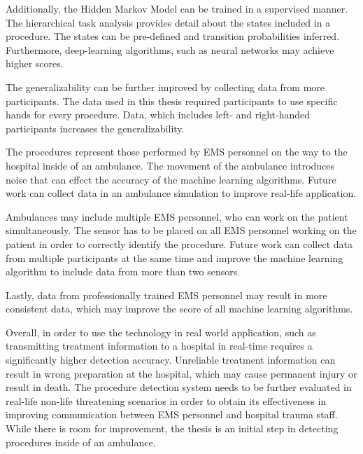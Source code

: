 \par Additionally, the Hidden Markov Model can be trained in a supervised manner. The hierarchical task analysis provides detail about the states included in a procedure. The states can be pre-defined and transition probabilities inferred. Furthermore, deep-learning algorithms, such as neural networks may achieve higher scores.
\par The generalizability can be further improved by collecting data from more participants. The data used in this thesis required participants to use specific hands for every procedure. Data, which includes left- and right-handed participants increases the generalizability.
\par The procedures represent those performed by EMS personnel on the way to the hospital inside of an ambulance. The movement of the ambulance introduces noise that can effect the accuracy of the machine learning algorithms. Future work can collect data in an ambulance simulation to improve real-life application.
\par Ambulances may include multiple EMS personnel, who can work on the patient simultaneously. The sensor has to be placed on all EMS personnel working on the patient in order to correctly identify the procedure. Future work can collect data from multiple participants at the same time and improve the machine learning algorithm to include data from more than two sensors.
\par Lastly, data from professionally trained EMS personnel may result in more consistent data, which may improve the score of all machine learning algorithms.
\par Overall, in order to use the technology in real world application, such as transmitting treatment information to a hospital in real-time requires a significantly higher detection accuracy. Unreliable treatment information can result in wrong preparation at the hospital, which may cause permanent injury or result in death. The procedure detection system needs to be further evaluated in real-life non-life threatening scenarios in order to obtain its effectiveness in improving communication between EMS personnel and hospital trauma staff. While there is room for improvement, the thesis is an initial step in detecting procedures inside of an ambulance.